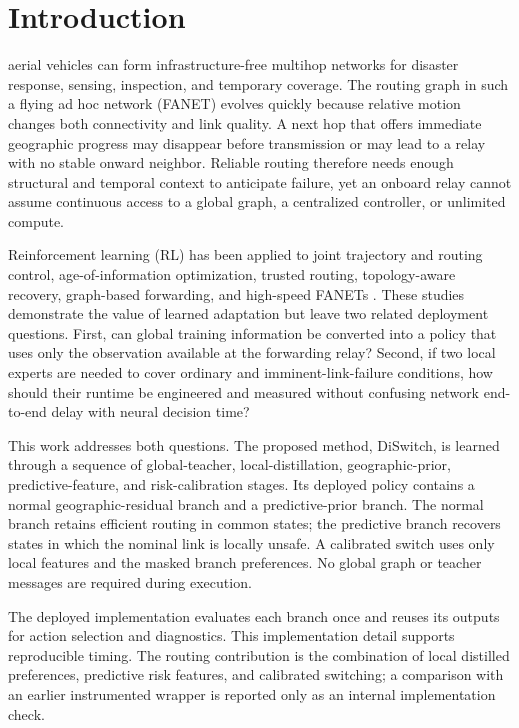 \documentclass{ieeeaccess}
\newcommand{\DS}{DiSwitch}
\begin{document}
\section{Introduction}

 aerial vehicles can form infrastructure-free multihop networks for disaster response, sensing, inspection, and temporary coverage. The routing graph in such a flying ad hoc network (FANET) evolves quickly because relative motion changes both connectivity and link quality. A next hop that offers immediate geographic progress may disappear before transmission or may lead to a relay with no stable onward neighbor. Reliable routing therefore needs enough structural and temporal context to anticipate failure, yet an onboard relay cannot assume continuous access to a global graph, a centralized controller, or unlimited compute.

Reinforcement learning (RL) has been applied to joint trajectory and routing control, age-of-information optimization, trusted routing, topology-aware recovery, graph-based forwarding, and high-speed FANETs \cite{alam2024joint,wu2026aoi,jia2025trusted,cui2022tarraq,zhang2025gat,shou2026adaptive}. These studies demonstrate the value of learned adaptation but leave two related deployment questions. First, can global training information be converted into a policy that uses only the observation available at the forwarding relay? Second, if two local experts are needed to cover ordinary and imminent-link-failure conditions, how should their runtime be engineered and measured without confusing network end-to-end delay with neural decision time?

This work addresses both questions. The proposed method, \DS{}, is learned through a sequence of global-teacher, local-distillation, geographic-prior, predictive-feature, and risk-calibration stages. Its deployed policy contains a normal geographic-residual branch and a predictive-prior branch. The normal branch retains efficient routing in common states; the predictive branch recovers states in which the nominal link is locally unsafe. A calibrated switch uses only local features and the masked branch preferences. No global graph or teacher messages are required during execution.

The deployed implementation evaluates each branch once and reuses its outputs for action selection and diagnostics. This implementation detail supports reproducible timing. The routing contribution is the combination of local distilled preferences, predictive risk features, and calibrated switching; a comparison with an earlier instrumented wrapper is reported only as an internal implementation check.
\end{document}
